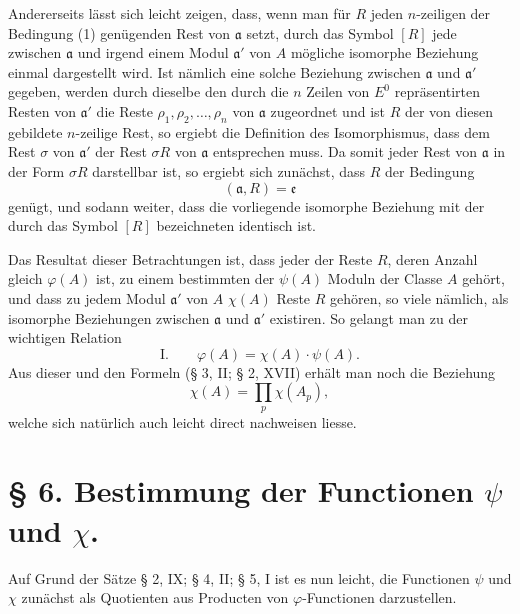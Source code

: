 \documentclass[11pt,a4paper]{article}
\begin{document}
Andererseits lässt sich leicht zeigen, dass, wenn man für $R$ jeden $n$-zeiligen der Bedingung (1) genügenden Rest von $\mathfrak a$ setzt, durch das Symbol $[R]$ jede zwischen $\mathfrak a$ und irgend einem Modul $\mathfrak a'$ von $A$ mögliche isomorphe Beziehung einmal dargestellt wird. Ist nämlich eine solche Beziehung zwischen $\mathfrak a$ und $\mathfrak a'$ gegeben, werden durch dieselbe den durch die $n$ Zeilen von $E^0$ repräsentirten Resten von $\mathfrak a'$ die Reste $\rho_1,\rho_2,\ldots,\rho_n$ von $\mathfrak a$ zugeordnet und ist $R$ der von diesen gebildete $n$-zeilige Rest, so ergiebt die Definition des Isomorphismus, dass dem Rest $\sigma$ von $\mathfrak a'$ der Rest $\sigma R$ von $\mathfrak a$ entsprechen muss. Da somit jeder Rest von $\mathfrak a$ in der Form $\sigma R$ darstellbar ist, so ergiebt sich zunächst, dass $R$ der Bedingung
\[
 (\mathfrak a,R)=\mathfrak e
\]
genügt, und sodann weiter, dass die vorliegende isomorphe Beziehung mit der durch das Symbol $[R]$ bezeichneten identisch ist.

Das Resultat dieser Betrachtungen ist, dass jeder der Reste $R$, deren Anzahl gleich $\varphi(A)$ ist, zu einem bestimmten der $\psi(A)$ Moduln der Classe $A$ gehört, und dass zu jedem Modul $\mathfrak a'$ von $A$ $\chi(A)$ Reste $R$ gehören, so viele nämlich, als isomorphe Beziehungen zwischen $\mathfrak a$ und $\mathfrak a'$ existiren. So gelangt man zu der wichtigen Relation
\[
\text{I.}\qquad \varphi(A)=\chi(A)\cdot\psi(A).
\]
Aus dieser und den Formeln (§ 3, II; § 2, XVII) erhält man noch die Beziehung
\[
 \chi(A)=\prod_p \chi(A_p),
\]
welche sich natürlich auch leicht direct nachweisen liesse.

\section*{§ 6. Bestimmung der Functionen $\psi$ und $\chi$.}

Auf Grund der Sätze § 2, IX; § 4, II; § 5, I ist es nun leicht, die Functionen $\psi$ und $\chi$ zunächst als Quotienten aus Producten von $\varphi$-Functionen darzustellen.
\end{document}
